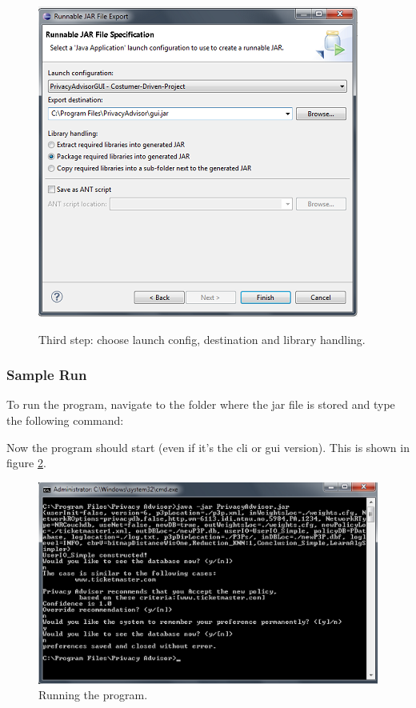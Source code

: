 \begin{figure}[h!]
  \begin{centering}
    \vspace{-10pt}
    \includegraphics[width = .6\textwidth]{Documentation/export_last.png}
    \vspace{-10pt}
    \caption{Third step: choose launch config, destination and library handling.}
    \vspace{-10pt}
    \label{exportLastStep}
  \end{centering}
\end{figure}


\subsubsection{Sample Run}
To run the program, navigate to the folder where the jar file is stored and type the following command:


Now the program should start (even if it's the cli or gui version). This is shown in figure \ref{runProgram}.

\begin{figure}[h!]
  \begin{centering}
    \includegraphics{Documentation/cli.png}
    \caption{Running the program.}
    \label{runProgram}
  \end{centering}
\end{figure}


